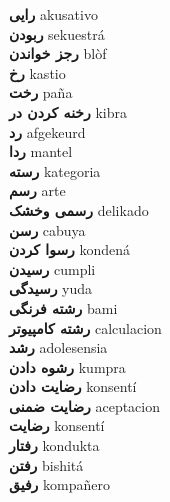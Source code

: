 \textbf{ رایی  } akusativo \\
\textbf{ ربودن  } sekuestrá \\
\textbf{ رجز خواندن  } blòf \\
\textbf{ رخ  } kastio \\
\textbf{ رخت  } paña \\
\textbf{ رخنه کردن در  } kibra \\
\textbf{ رد  } afgekeurd \\
\textbf{ ردا  } mantel \\
\textbf{ رسته  } kategoria \\
\textbf{ رسم  } arte \\
\textbf{ رسمی وخشک  } delikado \\
\textbf{ رسن  } cabuya \\
\textbf{ رسوا کردن  } kondená \\
\textbf{ رسیدن  } cumpli \\
\textbf{ رسیدگی  } yuda \\
\textbf{ رشته فرنگی  } bami \\
\textbf{ رشته کامپیوتر  } calculacion \\
\textbf{ رشد  } adolesensia \\
\textbf{ رشوه دادن  } kumpra \\
\textbf{ رضایت دادن  } konsentí \\
\textbf{ رضایت ضمنی  } aceptacion \\
\textbf{ رضایت  } konsentí \\
\textbf{ رفتار  } kondukta \\
\textbf{ رفتن  } bishitá \\
\textbf{ رفیق  } kompañero \\
